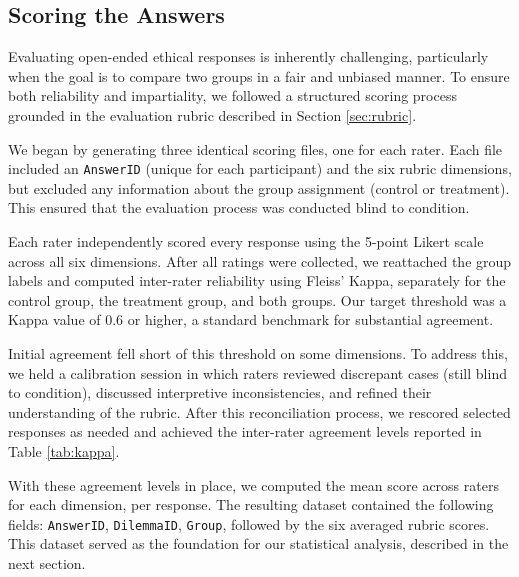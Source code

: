 \subsection{Scoring the Answers}
\label{sec:scoring}

Evaluating open-ended ethical responses is inherently challenging, particularly when the goal is to compare two groups in a fair and unbiased manner. To ensure both reliability and impartiality, we followed a structured scoring process grounded in the evaluation rubric described in Section \ref{sec:rubric}.

We began by generating three identical scoring files, one for each rater. Each file included an \texttt{AnswerID} (unique for each participant) and the six rubric dimensions, but excluded any information about the group assignment (control or treatment). This ensured that the evaluation process was conducted blind to condition.

Each rater independently scored every response using the 5-point Likert scale across all six dimensions. After all ratings were collected, we reattached the group labels and computed inter-rater reliability using Fleiss' Kappa, separately for the control group, the treatment group, and both groups. Our target threshold was a Kappa value of 0.6 or higher, a standard benchmark for substantial agreement.

Initial agreement fell short of this threshold on some dimensions. To address this, we held a calibration session in which raters reviewed discrepant cases (still blind to condition), discussed interpretive inconsistencies, and refined their understanding of the rubric. After this reconciliation process, we rescored selected responses as needed and achieved the inter-rater agreement levels reported in Table \ref{tab:kappa}.

\begin{table}[H]
  \centering
  \caption{Fleiss' Kappa Scores by Dimension and Group}
  \label{tab:kappa}
\end{table}

With these agreement levels in place, we computed the mean score across raters for each dimension, per response. The resulting dataset contained the following fields: \texttt{AnswerID}, \texttt{DilemmaID}, \texttt{Group}, followed by the six averaged rubric scores. This dataset served as the foundation for our statistical analysis, described in the next section.
